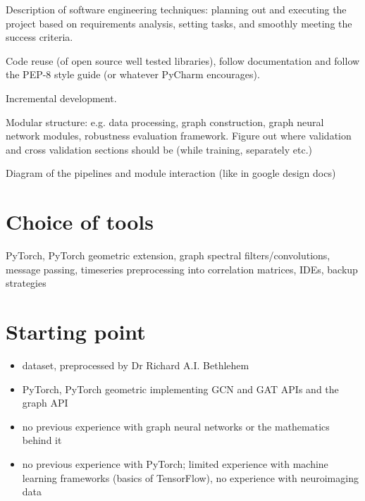 Description of software engineering techniques: planning out and executing the project based on requirements analysis, setting tasks, and smoothly meeting the success criteria.

Code reuse (of open source well tested libraries), follow documentation and follow the PEP-8 style guide (or whatever PyCharm encourages).

Incremental development.

Modular structure: e.g. data processing, graph construction, graph neural network modules, robustness evaluation framework. Figure out where validation and cross validation sections should be (while training, separately etc.)

Diagram of the pipelines and module interaction (like in google design docs)


\section{Choice of tools}
PyTorch, PyTorch geometric extension, graph spectral filters/convolutions, message passing, timeseries preprocessing into correlation matrices, IDEs, backup strategies

\section{Starting point}
\begin{itemize}
    \item dataset, preprocessed by Dr Richard A.I. Bethlehem
    \item PyTorch, PyTorch geometric implementing GCN and GAT APIs and the graph API
    \item no previous experience with graph neural networks or the mathematics behind it
    \item no previous experience with PyTorch; limited experience with machine learning frameworks (basics of TensorFlow), no experience with neuroimaging data
\end{itemize}
